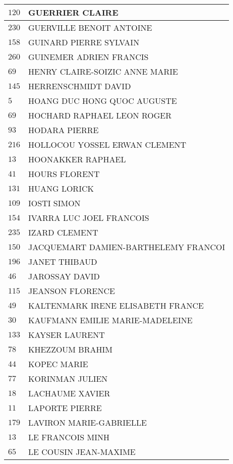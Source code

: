 \begin{xltabular}{\linewidth}{|l|X|}
    \hline
    $120$ & GUERRIER CLAIRE \\
    \hline
    $230$ & GUERVILLE BENOIT ANTOINE \\
    \hline
    $158$ & GUINARD PIERRE SYLVAIN \\
    \hline
    $260$ & GUINEMER ADRIEN FRANCIS \\
    \hline
    $69$ & HENRY CLAIRE-SOIZIC ANNE MARIE \\
    \hline
    $145$ & HERRENSCHMIDT DAVID \\
    \hline
    $5$ & HOANG DUC HONG QUOC AUGUSTE \\
    \hline
    $69$ & HOCHARD RAPHAEL LEON ROGER \\
    \hline
    $93$ & HODARA PIERRE \\
    \hline
    $216$ & HOLLOCOU YOSSEL ERWAN CLEMENT \\
    \hline
    $13$ & HOONAKKER RAPHAEL \\
    \hline
    $41$ & HOURS FLORENT \\
    \hline
    $131$ & HUANG LORICK \\
    \hline
    $109$ & IOSTI SIMON \\
    \hline
    $154$ & IVARRA LUC JOEL FRANCOIS \\
    \hline
    $235$ & IZARD CLEMENT \\
    \hline
    $150$ & JACQUEMART DAMIEN-BARTHELEMY FRANCOI \\
    \hline
    $196$ & JANET THIBAUD \\
    \hline
    $46$ & JAROSSAY DAVID \\
    \hline
    $115$ & JEANSON FLORENCE \\
    \hline
    $49$ & KALTENMARK IRENE ELISABETH FRANCE \\
    \hline
    $30$ & KAUFMANN EMILIE MARIE-MADELEINE \\
    \hline
    $133$ & KAYSER LAURENT \\
    \hline
    $78$ & KHEZZOUM BRAHIM \\
    \hline
    $44$ & KOPEC MARIE \\
    \hline
    $77$ & KORINMAN JULIEN \\
    \hline
    $18$ & LACHAUME XAVIER \\
    \hline
    $11$ & LAPORTE PIERRE \\
    \hline
    $179$ & LAVIRON MARIE-GABRIELLE \\
    \hline
    $13$ & LE FRANCOIS MINH \\
    \hline
    $65$ & LE COUSIN JEAN-MAXIME \\

\end{xltabular}
